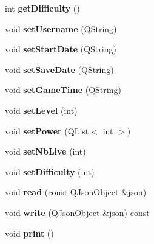 \begin{DoxyCompactItemize}
\item 
\hypertarget{class_profil_a10c2f4863000e5525f8504a22ccf1260}{}int {\bfseries get\+Difficulty} ()\label{class_profil_a10c2f4863000e5525f8504a22ccf1260}

\item 
\hypertarget{class_profil_a23d36025cd3b9ad9ff128021b16c2431}{}void {\bfseries set\+Username} (Q\+String)\label{class_profil_a23d36025cd3b9ad9ff128021b16c2431}

\item 
\hypertarget{class_profil_a3d6b5ead3c4e6af1aa3f4035fb3dd624}{}void {\bfseries set\+Start\+Date} (Q\+String)\label{class_profil_a3d6b5ead3c4e6af1aa3f4035fb3dd624}

\item 
\hypertarget{class_profil_a484838bb61b18b3c82fede9aaad41b35}{}void {\bfseries set\+Save\+Date} (Q\+String)\label{class_profil_a484838bb61b18b3c82fede9aaad41b35}

\item 
\hypertarget{class_profil_a2c9a526c1a26cb8b91c20a3a6df0ccc6}{}void {\bfseries set\+Game\+Time} (Q\+String)\label{class_profil_a2c9a526c1a26cb8b91c20a3a6df0ccc6}

\item 
\hypertarget{class_profil_a7edbce434f4b1c1bf1d98b704fcc650e}{}void {\bfseries set\+Level} (int)\label{class_profil_a7edbce434f4b1c1bf1d98b704fcc650e}

\item 
\hypertarget{class_profil_a1322566ebccffe1636df61c9bc74695d}{}void {\bfseries set\+Power} (Q\+List$<$ int $>$)\label{class_profil_a1322566ebccffe1636df61c9bc74695d}

\item 
\hypertarget{class_profil_ae8d5b07cd8bd4d8ad2a1e1b431056a0f}{}void {\bfseries set\+Nb\+Live} (int)\label{class_profil_ae8d5b07cd8bd4d8ad2a1e1b431056a0f}

\item 
\hypertarget{class_profil_ab4c02fb71667985e9e9ffe991ea6b824}{}void {\bfseries set\+Difficulty} (int)\label{class_profil_ab4c02fb71667985e9e9ffe991ea6b824}

\item 
\hypertarget{class_profil_ab834326ebb9864fca5aec8020d0ad6f8}{}void {\bfseries read} (const Q\+Json\+Object \&json)\label{class_profil_ab834326ebb9864fca5aec8020d0ad6f8}

\item 
\hypertarget{class_profil_a0c07c8aaf3e8b1fee2aeb5ee226f4206}{}void {\bfseries write} (Q\+Json\+Object \&json) const \label{class_profil_a0c07c8aaf3e8b1fee2aeb5ee226f4206}

\item 
\hypertarget{class_profil_a6c2dd8fc5f5604ce12959982309eed42}{}void {\bfseries print} ()\label{class_profil_a6c2dd8fc5f5604ce12959982309eed42}

\end{DoxyCompactItemize}
